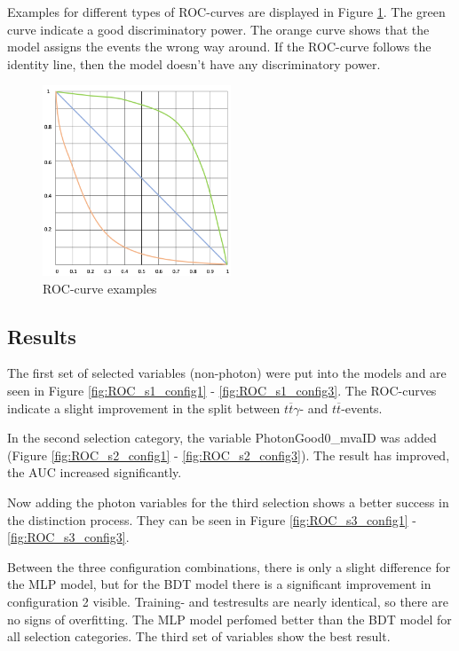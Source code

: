 \documentclass[11pt]{scrartcl}
\begin{document}
Examples for different types of ROC-curves are displayed in Figure \ref{fig:ROC_ex}. The green curve indicate a good discriminatory power. The orange curve shows that the model assigns the events the wrong way around. If the ROC-curve follows the identity line, then the model doesn't have any discriminatory power.

	\begin{figure}[H]
	\centering
	\includegraphics[width=0.5\textwidth]{figures/ROC_curve.png}
	\caption{ROC-curve examples}
	 \label{fig:ROC_ex}	
	\end{figure}
	
	\subsection{Results}
	
	The first set of selected variables (non-photon) were put into the models and are seen in Figure \ref{fig:ROC_s1_config1} - \ref{fig:ROC_s1_config3}. The ROC-curves indicate a slight improvement in the split between $t\overline{t}\gamma$- and $t\overline{t}$-events. 
	
		In the second selection category, the variable PhotonGood0\_mvaID was added (Figure \ref{fig:ROC_s2_config1} - \ref{fig:ROC_s2_config3}). The result has improved, the AUC increased significantly.
		
		Now adding the photon variables for the third selection shows a better success in the distinction process. They can be seen in Figure \ref{fig:ROC_s3_config1} - \ref{fig:ROC_s3_config3}. 
		
		Between the three configuration combinations, there is only a slight difference for the MLP model, but for the BDT model there is a significant improvement in configuration 2 visible. Training- and testresults are nearly identical, so there are no signs of overfitting. The MLP model perfomed better than the BDT model for all selection categories. The third set of variables show the best result.
				
\end{document}
